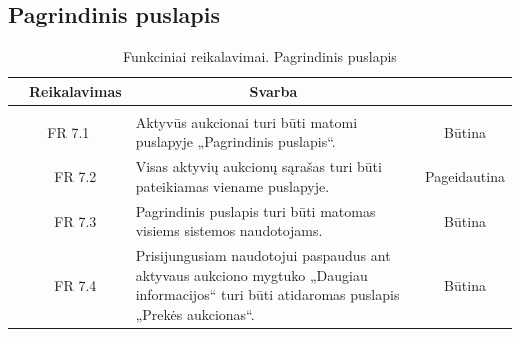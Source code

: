 \documentclass{VUMIFPSkursinis}
\begin{document}
	\subsection{Pagrindinis puslapis}
	\begin{table}[H]
		\caption{Funkciniai reikalavimai. Pagrindinis puslapis}
		\begin{tabular}{|p{1cm}|p{1cm}|p{}|p{}|}
			\hline
			\rowcolor{gray!50}
			\multicolumn{2}{|c|}{{\bfseries Kodas}}&
			\multicolumn{1}{c|}{{\bfseries Reikalavimas}}&
			\multicolumn{1}{c|}{{\bfseries Svarba}}\\
			\hline
			\rowcolor{lightgray}
			\multicolumn{4}{|c|}{Pagrindinis puslapis}\\

			\hline
			\multicolumn{2}{|c|}{FR 7.1}&
			{Aktyvūs aukcionai turi būti matomi puslapyje „Pagrindinis puslapis“.
			}&
			\multicolumn{1}{c|}{Būtina}\\
			\hline
			\multicolumn{1}{|c}{}&
			\multicolumn{1}{c|}{FR 7.2}&
			{Visas aktyvių aukcionų sąrašas turi būti pateikiamas viename puslapyje.
			}&
			\multicolumn{1}{c|}{Pageidautina}\\
			\hline
			\multicolumn{1}{|c}{}&
			\multicolumn{1}{c|}{FR 7.3}&
			{Pagrindinis puslapis turi būti matomas visiems sistemos naudotojams.
			}&
			\multicolumn{1}{c|}{Būtina}\\
			\hline
			\multicolumn{1}{|c}{}&
			\multicolumn{1}{c|}{FR 7.4}&
			{Prisijungusiam naudotojui paspaudus ant aktyvaus aukciono mygtuko „Daugiau informacijos“ turi būti atidaromas puslapis „Prekės aukcionas“.
			}&
			\multicolumn{1}{c|}{Būtina}\\
			\hline
		\end{tabular}
	\end{table}
\end{document}
